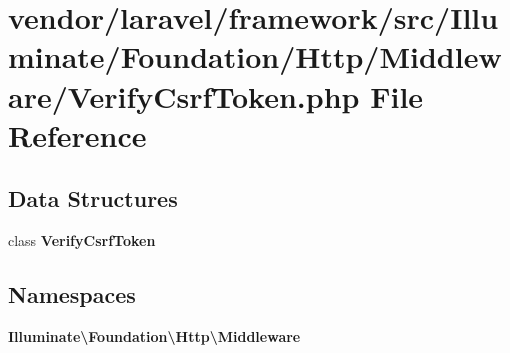 \section{vendor/laravel/framework/src/\+Illuminate/\+Foundation/\+Http/\+Middleware/\+Verify\+Csrf\+Token.php File Reference}
\label{vendor_2laravel_2framework_2src_2_illuminate_2_foundation_2_http_2_middleware_2_verify_csrf_token_8php}
\subsection*{Data Structures}
\begin{DoxyCompactItemize}
\item 
class {\bf Verify\+Csrf\+Token}
\end{DoxyCompactItemize}
\subsection*{Namespaces}
\begin{DoxyCompactItemize}
\item 
 {\bf Illuminate\textbackslash{}\+Foundation\textbackslash{}\+Http\textbackslash{}\+Middleware}
\end{DoxyCompactItemize}
